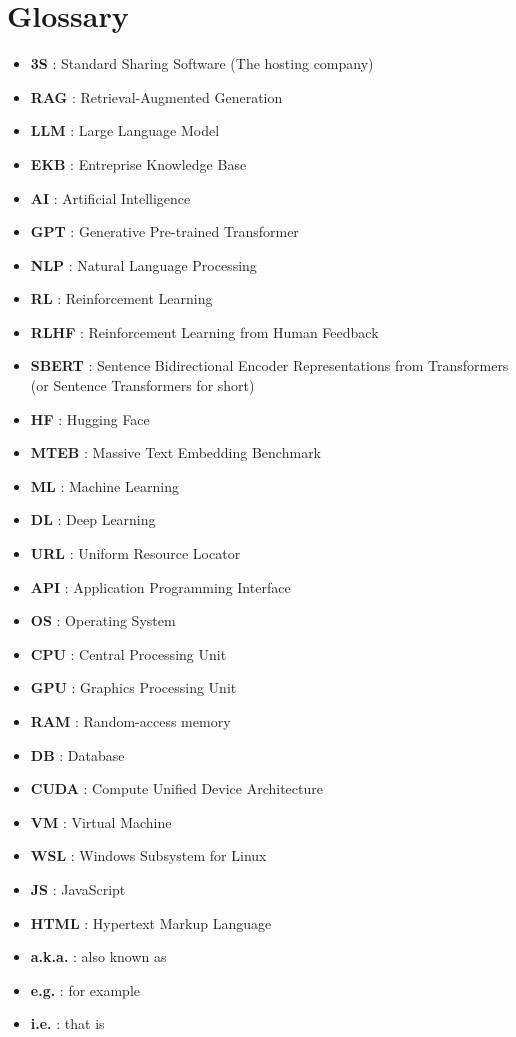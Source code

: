 \chapter*{Glossary}
\begin{itemize}
    \item \textbf{3S} : Standard Sharing Software (The hosting company)
    \item \textbf{RAG} : Retrieval-Augmented Generation
    \item \textbf{LLM} : Large Language Model
    \item \textbf{EKB} : Entreprise Knowledge Base
    \item \textbf{AI} : Artificial Intelligence
    \item \textbf{GPT} : Generative Pre-trained Transformer
    \item \textbf{NLP} : Natural Language Processing
    \item \textbf{RL} : Reinforcement Learning
    \item \textbf{RLHF} : Reinforcement Learning from Human Feedback
    \item \textbf{SBERT} : Sentence Bidirectional Encoder Representations from Transformers (or Sentence Transformers for short)
    \item \textbf{HF} : Hugging Face
    \item \textbf{MTEB} : Massive Text Embedding Benchmark
    \item \textbf{ML} : Machine Learning
    \item \textbf{DL} : Deep Learning
    \item \textbf{URL} : Uniform Resource Locator
    \item \textbf{API} : Application Programming Interface
    \item \textbf{OS} : Operating System
    \item \textbf{CPU} : Central Processing Unit
    \item \textbf{GPU} : Graphics Processing Unit
    \item \textbf{RAM} : Random-access memory
    \item \textbf{DB} : Database
    \item \textbf{CUDA} : Compute Unified Device Architecture
    \item \textbf{VM} : Virtual Machine
    \item \textbf{WSL} : Windows Subsystem for Linux
    \item \textbf{JS} : JavaScript
    \item \textbf{HTML} : Hypertext Markup Language
    \item \textbf{a.k.a.} : also known as
    \item \textbf{e.g.} : for example
    \item \textbf{i.e.} : that is
\end{itemize}